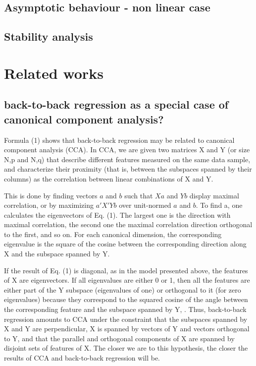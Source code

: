 \documentclass{article}
\begin{document}
\subsection{Asymptotic behaviour - non linear case}

\subsection{Stability analysis}


\section{Related works}
\subsection{back-to-back regression as a special case of canonical component analysis?}
Formula (1) shows that back-to-back regression may be related to canonical component analysis (CCA).
%
In CCA, we are given two matrices X and Y (or size N,p and N,q) that describe different features measured on the same data sample, and characterize their proximity (that is, between the subspaces spanned by their columns) as the correlation between linear combinations of X and Y.

This is done by finding vectors $a$ and $b$ such that $Xa$ and $Yb$ display maximal correlation, or by maximizing $a'X'Yb$ over unit-normed $a$ and $b$.
%
To find a, one calculates the eigenvectors of Eq. (1).
%
The largest one is the direction with maximal correlation, the second one the maximal correlation direction orthogonal to the first, and so on.
%
For each canonical dimension, the corresponding eigenvalue is the square of the cosine between the corresponding direction along X and the subspace spanned by Y.

If the result of Eq. (1) is diagonal, as in the model presented above, the features of X are eigenvectors.
%
If all eigenvalues are either 0 or 1, then all the features are either part of the Y subspace (eigenvalues of one) or orthogonal to it (for zero eigenvalues) because they correspond to the squared cosine of the angle between the corresponding feature and the subspace spanned by Y, .
%
Thus, back-to-back regression amounts to CCA under the constraint that the subspaces spanned by X and Y are perpendicular, X is spanned by vectors of Y and vectors orthogonal to Y, and that the parallel and orthogonal components of X are spanned by disjoint sets of features of X.
%
The closer we are to this hypothesis, the closer the results of CCA and back-to-back regression will be.
\end{document}
